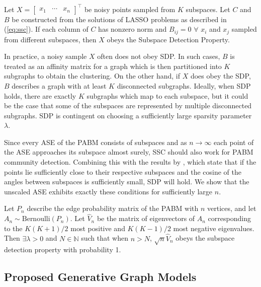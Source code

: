 \documentclass[
  11pt,
]{article}
\begin{document}
\begin{definition} 
Let $X = \begin{bmatrix} x_1 & \cdots & x_n \end{bmatrix}^\top$ be noisy 
points sampled from $K$ subspaces. Let $C$ and $B$ be constructed from the 
solutions of LASSO problems as described in (\ref{eq:ssc}). If each column of 
$C$ has nonzero norm and $B_{ij} = 0$ $\forall$ $x_i$ and $x_j$ sampled from 
different subspaces, then $X$ obeys the Subspace Detection Property. 
\end{definition}

\begin{remark} 
In practice, a noisy sample $X$ often does not obey SDP. 
In such cases, $B$ is treated as an affinity matrix for a graph which 
is then partitioned into $K$ subgraphs to obtain the clustering. On the other 
hand, if $X$ does obey the SDP, $B$ describes a graph 
with at least $K$ disconnected subgraphs. Ideally, when SDP holds, 
there are exactly $K$ subgraphs which map to each subspace, 
but it could be the case that some of the subspaces are represented by 
multiple disconnected subgraphs. SDP is contingent 
on choosing a sufficiently large sparsity parameter $\lambda$. 
\end{remark}

Since every ASE of the PABM consists of subspaces and as
\(n \to \infty\) each point of the ASE approaches its subspace almost
surely, SSC should also work for PABM community detection. Combining
this with the results by \citeauthor{jmlr-v28-wang13}, which state that
if the points lie sufficiently close to their respective subspaces and
the cosine of the angles between subspaces is sufficiently small, SDP
will hold. We show that the unscaled ASE exhibits exactly these
conditions for sufficiently large \(n\).

\begin{theorem}
\label{theorem5}
Let $P_n$ describe the edge probability matrix of the PABM with 
$n$ vertices, and let $A_n \sim \text{Bernoulli}(P_n)$.  Let $\hat{V}_n$ be the 
matrix of eigenvectors of $A_n$ corresponding to the $K (K + 1) / 2$ most
positive and $K (K - 1) / 2$ most negative eigenvalues. Then 
$\exists \lambda > 0$ and $N \in \mathbb{N}$ such that when $n > N$, 
$\sqrt{n} \hat{V}_n$ obeys the subspace detection property with probability 1.
\end{theorem}

\hypertarget{proposed-generative-graph-models}{%
\subsection{Proposed Generative Graph
Models}\label{proposed-generative-graph-models}}
\end{document}
